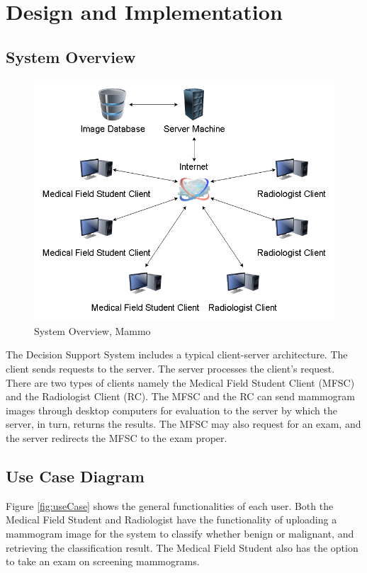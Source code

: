 \section{Design and Implementation}

\subsection{System Overview}
\begin{figure}[h]
	\centering
  	\includegraphics[scale=0.5]{images/systemOverview.png}
	 \caption{System Overview, Mammo}
  	\label{fig:systemOverview}
\end{figure}

	The Decision Support System includes a typical client-server architecture. The client sends requests to the server. The server processes the client's request. There are two types of clients namely the Medical Field Student Client (MFSC) and the Radiologist Client (RC). The MFSC and the RC can send mammogram images through desktop computers for evaluation to the server by which the server, in turn, returns the results. The MFSC may also request for an exam, and the server redirects the MFSC to the exam proper.
\clearpage

\subsection{Use Case Diagram}
\qquad Figure \ref{fig:useCase} shows the general functionalities of each user. Both the Medical Field Student and Radiologist have the functionality of uploading a mammogram image for the system to classify whether benign or malignant, and retrieving the classification result. The Medical Field Student also has the option to take an exam on screening mammograms.

